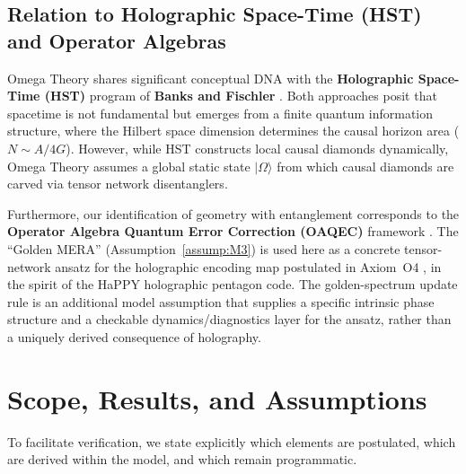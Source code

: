 \subsection{Relation to Holographic Space-Time (HST) and Operator Algebras}
Omega Theory shares significant conceptual DNA with the \textbf{Holographic Space-Time (HST)} program of \textbf{Banks and Fischler} \cite{Banks2018}. Both approaches posit that spacetime is not fundamental but emerges from a finite quantum information structure, where the Hilbert space dimension determines the causal horizon area ($N \sim A/4G$). However, while HST constructs local causal diamonds dynamically, Omega Theory assumes a global static state $|\Omega\rangle$ from which causal diamonds are carved via tensor network disentanglers.

Furthermore, our identification of geometry with entanglement corresponds to the \textbf{Operator Algebra Quantum Error Correction (OAQEC)} framework \cite{Harlow2017, Pastawski2015}. The ``Golden MERA'' (Assumption~\ref{assump:M3}) is used here as a concrete tensor-network ansatz for the holographic encoding map postulated in Axiom~O4 \cite{Vidal2007MERA,Swingle2012MERA}, in the spirit of the HaPPY holographic pentagon code. The golden-spectrum update rule is an additional model assumption that supplies a specific intrinsic phase structure and a checkable dynamics/diagnostics layer for the ansatz, rather than a uniquely derived consequence of holography.

\section{Scope, Results, and Assumptions}
\label{chap:scope}

To facilitate verification, we state explicitly which elements are postulated, which are derived within the model, and which remain programmatic.

